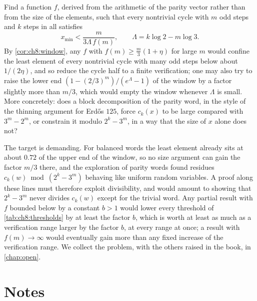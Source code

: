 \begin{problem*}
Find a function $f$, derived from the arithmetic of the parity vector rather
than from the size of the elements, such that every nontrivial cycle with $m$
odd steps and $k$ steps in all satisfies
\[
  x_{\min}<\frac{m}{3\Lambda\,f(m)},\qquad\Lambda=k\log2-m\log3 .
\]
By \cref{cor:ch8:window}, any $f$ with $f(m)\geq\frac m3(1+\eta)$ for large $m$ would confine the least element of every nontrivial cycle with many odd steps below about $1/(2\eta)$, and so reduce the cycle half to a finite verification; one may also try to raise the lower end $(1-(2/3)^m)/(e^{\Lambda}-1)$ of the window by a factor slightly more than $m/3$, which would empty the window whenever $\Lambda$ is small.
More concretely: does a block decomposition of the parity word, in
the style of the thinning argument for Erd\H{o}s $125$, force $c_k(x)$ to be
large compared with $3^m-2^m$, or constrain it modulo $2^k-3^m$, in a way that
the size of $x$ alone does not?
\end{problem*}

The target is demanding. For balanced words the least element already sits at
about $0.72$ of the upper end of the window, so no size argument can gain the
factor $m/3$ there, and the exploration of parity words found residues
$c_k(w)\bmod(2^k-3^m)$ behaving like uniform random variables. A proof along
these lines must therefore exploit divisibility, and would amount to showing
that $2^k-3^m$ never divides $c_k(w)$ except for the trivial word. Any partial
result with $f$ bounded below by a constant $b>1$ would lower every threshold of \cref{tab:ch8:thresholds} by at least the factor $b$, which is worth at least as much as a verification range larger by the factor $b$, at every range at once; a result with $f(m)\to\infty$ would eventually gain more than any fixed increase of the verification range. We collect the problem, with the others raised in the book, in
\cref{chap:open}.

\section*{Notes}

